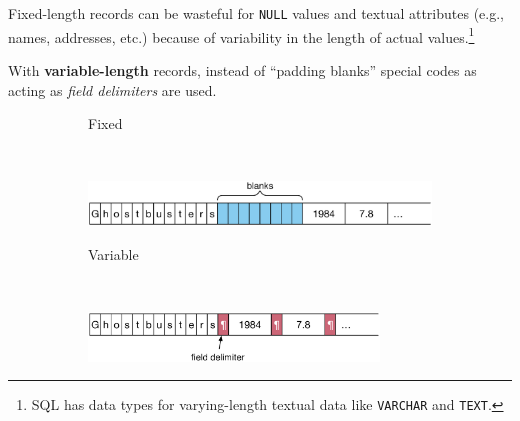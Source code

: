 %
%
\begin{frame}

Fixed-length records can be wasteful for \lstinline[style=SQL]{NULL} values and textual attributes (e.g., names, addresses, etc.) because of variability in the length of actual values.\footnote{SQL has data types for varying-length textual data like \texttt{VARCHAR} and \texttt{TEXT}.}

With \textbf{variable-length} records, instead of ``padding blanks'' special codes as acting as \emph{field delimiters} are used.

\begin{figure}
\begin{subfigure}{0.22\textwidth}
\hfill Fixed
\end{subfigure}
~
\begin{subfigure}{0.74\textwidth}
\includegraphics[width=\textwidth]{figures/fixed_length_example}
\end{subfigure}
\end{figure}

\begin{figure}
\begin{subfigure}{0.22\textwidth}
\hfill Variable
\end{subfigure}
~
\begin{subfigure}{0.74\textwidth}
\includegraphics[width=0.85\textwidth]{figures/variable_length_example}
\end{subfigure}
\end{figure}
\end{frame}

%
%

